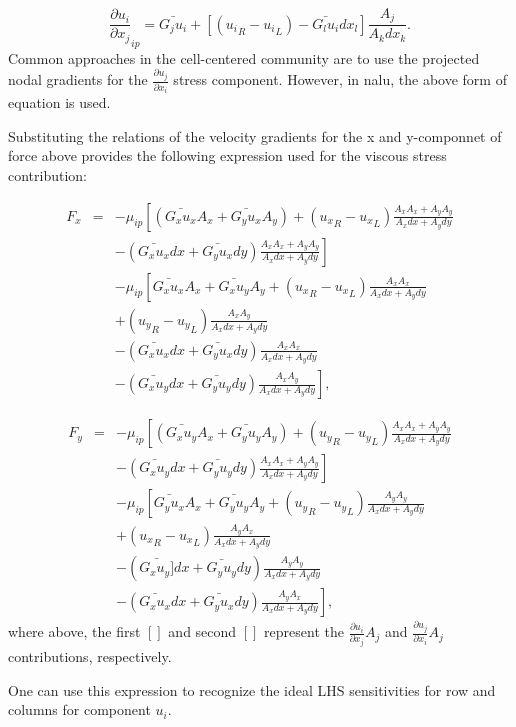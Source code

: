 \begin{equation}
  \frac{\partial u_i}{\partial x_j}_{ip} = \bar{G_j u_i} + \left[ \left({u_i}_R - {u_i}_L \right) 
- \bar{G_l u_i}dx_l \right] \frac{A_j}{A_k dx_k}.
\end{equation}
\label{vectorGrad}
Common approaches in the cell-centered community are to use the projected nodal gradients
for the $ \frac{\partial u_j}{\partial x_i}$ stress component. However, in nalu, the above
form of equation is used.

Substituting the relations of the velocity gradients for the x and y-componnet of force above provides the
following expression used for the viscous stress contribution:

\begin{eqnarray}
  F_x &=& - \mu_{ip} \left[ \left(\bar{G_x u_x}A_x + \bar{G_y u_x}A_y \right)
    + \left( {u_x}_R -  {u_x}_L \right) \frac{A_x A_x + A_y A_y}{A_x dx + A_y dy} \right. \nonumber \\ &&
  - \left. \left( \bar{G_x u_x}dx + \bar{G_y u_x}dy \right) \frac{A_x A_x + A_y A_y} {A_x dx + A_y dy} \right] \nonumber  \\ &&
  - \mu_{ip} \left[ \bar{G_x u_x}A_x + \bar{G_x u_y}A_y + \left({u_x}_R - {u_x}_L\right) \frac{A_x A_x} {A_x dx + A_y dy} \right. \nonumber \\&&
    + \left. \left({u_y}_R - {u_y}_L\right) \frac{A_x A_y} {A_x dx + A_y dy} \right. \nonumber \\ &&
    - \left. \left( \bar{G_x u_x}dx +  \bar{G_y u_x}dy \right) \frac{A_x A_x} {A_x dx + A_y dy} \right. \nonumber \\ &&
    - \left. \left( \bar{G_x u_y}dx +  \bar{G_y u_y}dy \right) \frac{A_x A_y} {A_x dx + A_y dy} \right],
\end{eqnarray}

\begin{eqnarray}
  F_y &=& - \mu_{ip} \left[ \left(\bar{G_x u_y}A_x + \bar{G_y u_y}A_y \right)
    + \left( {u_y}_R -  {u_y}_L \right) \frac{A_x A_x + A_y A_y}{A_x dx + A_y dy} \right. \nonumber \\ &&
  - \left. \left( \bar{G_x u_y}dx + \bar{G_y u_y}dy \right) \frac{A_x A_x + A_y A_y} {A_x dx + A_y dy} \right] \nonumber \\ &&
  - \mu_{ip} \left[ \bar{G_y u_x}A_x + \bar{G_y u_y}A_y + \left({u_y}_R - {u_y}_L\right) \frac{A_y A_y} {A_x dx + A_y dy} \right. \nonumber \\&&
    + \left. \left({u_x}_R - {u_x}_L\right) \frac{A_y A_x} {A_x dx + A_y dy} \right. \nonumber \\ &&
    - \left. \left( \bar{G_x u_y]}dx +  \bar{G_y u_y}dy \right) \frac{A_y A_y} {A_x dx + A_y dy} \right. \nonumber \\ &&
    - \left. \left( \bar{G_x u_x}dx +  \bar{G_y u_x}dy \right) \frac{A_y A_x} {A_x dx + A_y dy} \right],
\end{eqnarray}
where above, the first $[]$ and second $[]$ represent the $\frac{\partial u_i}{\partial x_j}A_j$ and  
$\frac{\partial u_j}{\partial x_i}A_j$ contributions, respectively.

One can use this expression to recognize the ideal LHS sensitivities for row and columns for 
component $u_i$. 

